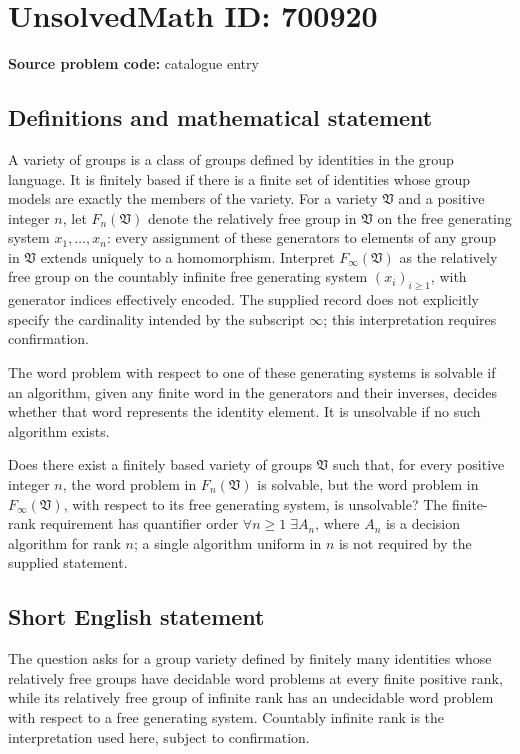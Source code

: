 \documentclass[11pt]{article}
\begin{document}
\section*{UnsolvedMath ID: 700920}
\textbf{Source problem code:} catalogue entry
\subsection{Definitions and mathematical statement}
A variety of groups is a class of groups defined by identities in the group language. It is finitely based if there is a finite set of identities whose group models are exactly the members of the variety. For a variety \(\mathfrak V\) and a positive integer \(n\), let \(F_n(\mathfrak V)\) denote the relatively free group in \(\mathfrak V\) on the free generating system \(x_1,\ldots,x_n\): every assignment of these generators to elements of any group in \(\mathfrak V\) extends uniquely to a homomorphism. Interpret \(F_\infty(\mathfrak V)\) as the relatively free group on the countably infinite free generating system \((x_i)_{i\geq 1}\), with generator indices effectively encoded. The supplied record does not explicitly specify the cardinality intended by the subscript \(\infty\); this interpretation requires confirmation.

The word problem with respect to one of these generating systems is solvable if an algorithm, given any finite word in the generators and their inverses, decides whether that word represents the identity element. It is unsolvable if no such algorithm exists.

Does there exist a finitely based variety of groups \(\mathfrak V\) such that, for every positive integer \(n\), the word problem in \(F_n(\mathfrak V)\) is solvable, but the word problem in \(F_\infty(\mathfrak V)\), with respect to its free generating system, is unsolvable? The finite-rank requirement has quantifier order \(\forall n\geq 1\;\exists A_n\), where \(A_n\) is a decision algorithm for rank \(n\); a single algorithm uniform in \(n\) is not required by the supplied statement.
\subsection{Short English statement}
The question asks for a group variety defined by finitely many identities whose relatively free groups have decidable word problems at every finite positive rank, while its relatively free group of infinite rank has an undecidable word problem with respect to a free generating system. Countably infinite rank is the interpretation used here, subject to confirmation.
\end{document}
